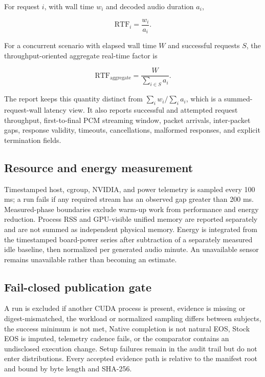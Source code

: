 For request $i$, with wall time $w_i$ and decoded audio duration $a_i$,

\begin{equation}
  \mathrm{RTF}_i = \frac{w_i}{a_i}.
\end{equation}

For a concurrent scenario with elapsed wall time $W$ and successful requests
$S$, the throughput-oriented aggregate real-time factor is

\begin{equation}
  \mathrm{RTF}_{\mathrm{aggregate}} =
  \frac{W}{\sum_{i \in S} a_i}.
\end{equation}

The report keeps this quantity distinct from
$\sum_i w_i / \sum_i a_i$, which is a summed-request-wall latency view. It also
reports successful and attempted request throughput, first-to-final PCM
streaming window, packet arrivals, inter-packet gaps, response validity,
timeouts, cancellations, malformed responses, and explicit termination fields.

\subsection{Resource and energy measurement}

Timestamped host, cgroup, NVIDIA, and power telemetry is sampled every 100 ms;
a run fails if any required stream has an observed gap greater than 200 ms.
Measured-phase boundaries exclude warm-up work from performance and energy
reduction. Process RSS and GPU-visible unified memory are reported separately
and are not summed as independent physical memory. Energy is integrated from
the timestamped board-power series after subtraction of a separately measured
idle baseline, then normalized per generated audio minute. An unavailable
sensor remains unavailable rather than becoming an estimate.

\subsection{Fail-closed publication gate}

A run is excluded if another CUDA process is present, evidence is missing or
digest-mismatched, the workload or normalized sampling differs between
subjects, the success minimum is not met, Native completion is not natural EOS,
Stock EOS is imputed, telemetry cadence fails, or the comparator contains an
undisclosed execution change. Setup failures remain in the audit trail but do
not enter distributions. Every accepted evidence path is relative to the
manifest root and bound by byte length and SHA-256.
